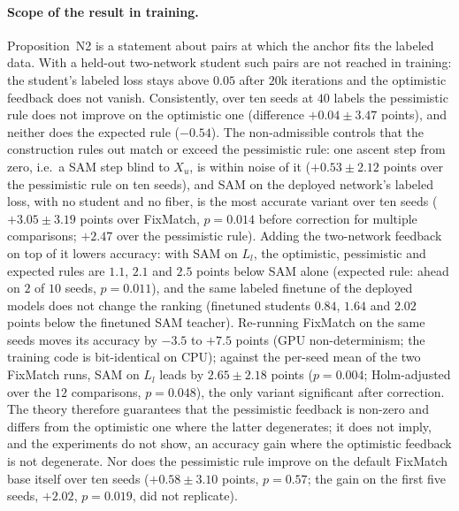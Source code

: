 \paragraph{Scope of the result in training.} Proposition~N2 is a statement about pairs at which
the anchor fits the labeled data. With a held-out two-network student such pairs are not
reached in training: the student's labeled loss stays above $0.05$ after $20$k iterations and the
optimistic feedback does not vanish. Consistently, over ten seeds at $40$ labels the pessimistic
rule does not improve on the optimistic one (difference $+0.04\pm3.47$ points), and neither
does the expected rule ($-0.54$). The non-admissible controls that the construction rules out
match or exceed the pessimistic rule: one ascent step from zero, i.e.\ a SAM step blind to
$X_u$, is within noise of it ($+0.53\pm2.12$ points over the pessimistic rule on ten seeds), and
SAM on the deployed network's labeled loss, with no student and no fiber, is the most accurate
variant over ten seeds ($+3.05\pm3.19$ points over FixMatch, $p=0.014$ before correction for
multiple comparisons; $+2.47$ over the pessimistic rule). Adding the two-network feedback on top
of it lowers accuracy: with SAM on $L_l$, the optimistic, pessimistic and expected rules are
$1.1$, $2.1$ and $2.5$ points below SAM alone (expected rule: ahead on $2$ of $10$ seeds,
$p=0.011$), and the same labeled finetune of the deployed models does not change the ranking
(finetuned students $0.84$, $1.64$ and $2.02$ points below the finetuned SAM teacher).
Re-running FixMatch on the same seeds moves its accuracy by $-3.5$ to $+7.5$ points (GPU
non-determinism; the training code is bit-identical on CPU); against the per-seed mean of the
two FixMatch runs, SAM on $L_l$ leads by $2.65\pm2.18$ points ($p=0.004$; Holm-adjusted over
the $12$ comparisons, $p=0.048$), the only variant significant after correction. The theory therefore guarantees that
the pessimistic feedback is non-zero and differs from the optimistic one where the latter
degenerates; it does not imply, and the
experiments do not show, an accuracy gain where the optimistic feedback is not degenerate.
Nor does the pessimistic rule improve on the default FixMatch base itself over ten seeds
($+0.58\pm3.10$ points, $p=0.57$; the gain on the first five seeds, $+2.02$, $p=0.019$, did not
replicate).

